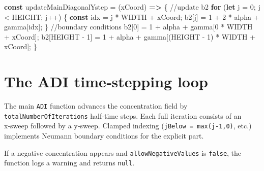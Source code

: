 \documentclass[
  letterpaper,
  DIV=11,
  numbers=noendperiod]{scrreprt}
\newenvironment{Shaded}{\begin{snugshade}}{\end{snugshade}}
\newcommand{\CommentTok}[1]{\textcolor[rgb]{0.37,0.37,0.37}{#1}}
\newcommand{\ControlFlowTok}[1]{\textcolor[rgb]{0.00,0.23,0.31}{\textbf{#1}}}
\newcommand{\DecValTok}[1]{\textcolor[rgb]{0.68,0.00,0.00}{#1}}
\newcommand{\KeywordTok}[1]{\textcolor[rgb]{0.00,0.23,0.31}{\textbf{#1}}}
\newcommand{\NormalTok}[1]{\textcolor[rgb]{0.00,0.23,0.31}{#1}}
\newcommand{\OperatorTok}[1]{\textcolor[rgb]{0.37,0.37,0.37}{#1}}
\begin{document}
\label{adi-update-diagonal-y}%
\begin{Shaded}
\begin{Highlighting}[]
\KeywordTok{const}\NormalTok{ updateMainDiagonalYstep }\OperatorTok{=}\NormalTok{ (xCoord) }\KeywordTok{=\textgreater{}}\NormalTok{ \{}
    \CommentTok{//update b2}
    \ControlFlowTok{for}\NormalTok{ (}\KeywordTok{let}\NormalTok{ j }\OperatorTok{=} \DecValTok{0}\OperatorTok{;}\NormalTok{ j }\OperatorTok{\textless{}}\NormalTok{ HEIGHT}\OperatorTok{;}\NormalTok{ j}\OperatorTok{++}\NormalTok{) \{}
        \KeywordTok{const}\NormalTok{ idx }\OperatorTok{=}\NormalTok{ j }\OperatorTok{*}\NormalTok{ WIDTH }\OperatorTok{+}\NormalTok{ xCoord}\OperatorTok{;}
\NormalTok{        b2[j] }\OperatorTok{=} \DecValTok{1} \OperatorTok{+} \DecValTok{2} \OperatorTok{*}\NormalTok{ alpha }\OperatorTok{+}\NormalTok{ gamma[idx]}\OperatorTok{;}
\NormalTok{    \}}
    \CommentTok{//boundary conditions}
\NormalTok{    b2[}\DecValTok{0}\NormalTok{] }\OperatorTok{=} \DecValTok{1} \OperatorTok{+}\NormalTok{ alpha }\OperatorTok{+}\NormalTok{ gamma[}\DecValTok{0} \OperatorTok{*}\NormalTok{ WIDTH }\OperatorTok{+}\NormalTok{ xCoord]}\OperatorTok{;}
\NormalTok{    b2[HEIGHT }\OperatorTok{{-}} \DecValTok{1}\NormalTok{] }\OperatorTok{=} \DecValTok{1} \OperatorTok{+}\NormalTok{ alpha }\OperatorTok{+}\NormalTok{ gamma[(HEIGHT }\OperatorTok{{-}} \DecValTok{1}\NormalTok{) }\OperatorTok{*}\NormalTok{ WIDTH }\OperatorTok{+}\NormalTok{ xCoord]}\OperatorTok{;}
\NormalTok{\}}
\end{Highlighting}
\end{Shaded}

\section{The ADI time‑stepping loop}\label{the-adi-timestepping-loop}

The main \texttt{ADI} function advances the concentration field by
\texttt{totalNumberOfIterations} half‑time steps. Each full iteration
consists of an x‑sweep followed by a y‑sweep. Clamped indexing
(\texttt{jBelow\ =\ max(j-1,0)}, etc.) implements Neumann boundary
conditions for the explicit part.

If a negative concentration appears and \texttt{allowNegativeValues} is
\texttt{false}, the function logs a warning and returns \texttt{null}.
\end{document}
